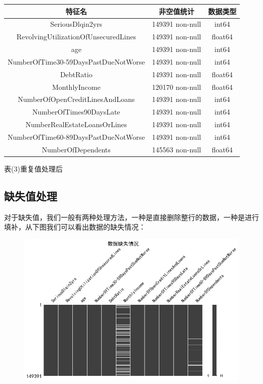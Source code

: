 \documentclass[12pt]{article}
\begin{document}
\begin{tabular}{|c|c|c|}
	\hline 
	特征名  & 非空值统计  & 数据类型 \\ 
	\hline 
	SeriousDlqin2yrs & 149391 non-null & int64  \\ 
	\hline 
	RevolvingUtilizationOfUnsecuredLines & 149391 non-null & float64 \\ 
	\hline 
	age & 149391 non-null & int64  \\ 
	\hline 
	NumberOfTime30-59DaysPastDueNotWorse & 149391 non-null & int64  \\ 
	\hline 
	DebtRatio   & 149391 non-null & float64 \\ 
	\hline 
	MonthlyIncome & 120170 non-null & float64 \\ 
	\hline 
	NumberOfOpenCreditLinesAndLoans & 149391 non-null & int64 \\ 
	\hline 
	NumberOfTimes90DaysLate  & 149391 non-null & int64 \\ 
	\hline 
	NumberRealEstateLoansOrLines  & 149391 non-null & int64 \\ 
	\hline 
	NumberOfTime60-89DaysPastDueNotWorse & 149391 non-null & int64 \\ 
	\hline 
	NumberOfDependents & 145563  non-null & float64 \\ 
	\hline 
\end{tabular} 
\begin{center}
	表(3)重复值处理后
\end{center}
\newpage

\subsection{缺失值处理}

\begin{flushleft}
	\noindent\qquad 对于缺失值，我们一般有两种处理方法，一种是直接删除整行的数据，一种是进行填补，从下图我们可以看出数据的缺失情况：
\end{flushleft}

\begin{figure}[H]
	\centering
	\includegraphics[width=0.8\linewidth]{figures/3}
	\caption{}
\end{figure}
\end{document}
